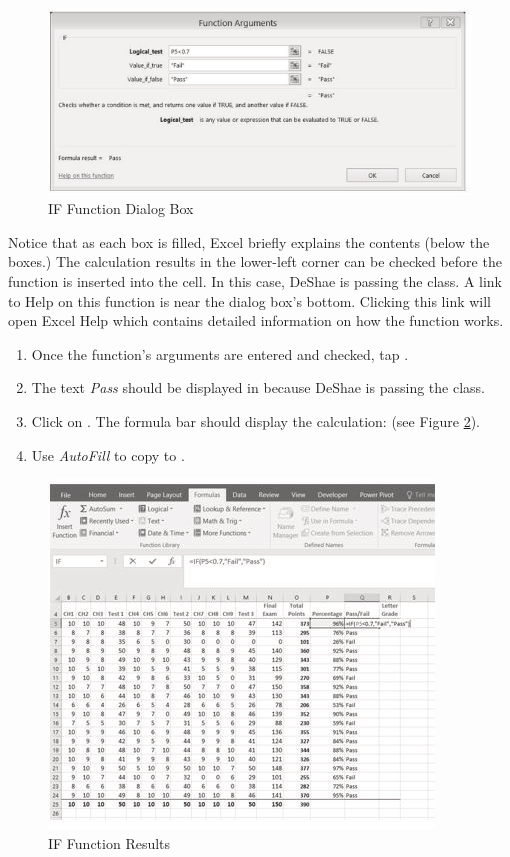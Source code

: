 \begin{figure}[H]
	\centering
	\includegraphics[width=\maxwidth{.95\linewidth}]{gfx/ch03_fig10}
	\caption{IF Function Dialog Box}
	\label{03:fig10}
\end{figure}

Notice that as each box is filled, Excel briefly explains the contents (below the boxes.) The calculation results in the lower-left corner can be checked before the function is inserted into the cell. In this case, DeShae is passing the class. A link to Help on this function is near the dialog box's bottom. Clicking this link will open Excel Help which contains detailed information on how the function works.

\begin{enumbox}
	\begin{enumerate}
		\item Once the function's arguments are entered and checked, tap . 
		\item The text \textit{Pass} should be displayed in  because DeShae is passing the class.
		\item Click on . The formula bar should display the  calculation:  (see Figure \ref{03:fig11}).
		\item Use \textit{AutoFill} to copy  to .
	\end{enumerate}
\end{enumbox}
	
\begin{figure}[H]
	\centering
	\includegraphics[width=\maxwidth{.95\linewidth}]{gfx/ch03_fig11}
	\caption{IF Function Results}
	\label{03:fig11}
\end{figure}

